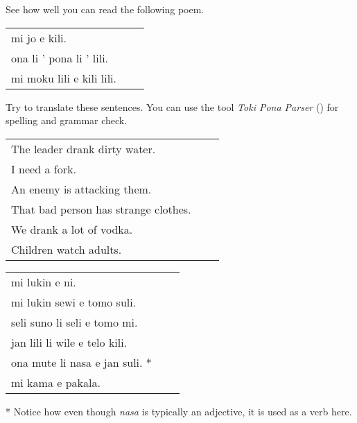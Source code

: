 See how well you can read the following poem.

\begin{supertabular}{p{5,5cm}|ll}
    mi jo e kili.             &  & \\
    ona li ' pona li ' lili.  &  & \\
    mi moku lili e kili lili. &  & \\
\end{supertabular}

Try to translate these sentences.
You can use the tool \textit{Toki Pona Parser} (\cite{www:rowa:02}) for spelling and grammar check.

\begin{supertabular}{p{5,5cm}|ll}
    The leader drank dirty water.        &  & \\
    I need a fork.                       &  & \\
    An enemy is attacking them.          &  & \\
    That bad person has strange clothes. &  & \\
    We drank a lot of vodka.             &  & \\
    Children watch adults.               &  & \\
\end{supertabular}

\begin{supertabular}{p{5,5cm}|ll}
    mi lukin e ni.                 &  & \\
    mi lukin sewi e tomo suli.     &  & \\
    seli suno li seli e tomo mi.   &  & \\
    jan lili li wile e telo kili.  &  & \\
    ona mute li nasa e jan suli. * &  & \\
    mi kama e pakala.              &  & \\
\end{supertabular}

* Notice how even though \textit{nasa} is typically an adjective, it is used as a verb here.
